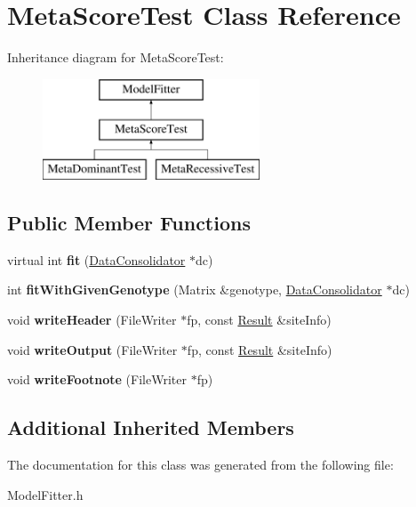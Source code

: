 \hypertarget{classMetaScoreTest}{\section{Meta\-Score\-Test Class Reference}
\label{classMetaScoreTest}
}
Inheritance diagram for Meta\-Score\-Test\-:\begin{figure}[H]
\begin{center}
\leavevmode
\includegraphics[height=3.000000cm]{classMetaScoreTest}
\end{center}
\end{figure}
\subsection*{Public Member Functions}
\begin{DoxyCompactItemize}
\item 
\hypertarget{classMetaScoreTest_a3342caf82dc635e98b676e6e43254fee}{virtual int {\bfseries fit} (\hyperlink{classDataConsolidator}{Data\-Consolidator} $\ast$dc)}\label{classMetaScoreTest_a3342caf82dc635e98b676e6e43254fee}

\item 
\hypertarget{classMetaScoreTest_a48b8ec26ac543a624308211daf486d1a}{int {\bfseries fit\-With\-Given\-Genotype} (Matrix \&genotype, \hyperlink{classDataConsolidator}{Data\-Consolidator} $\ast$dc)}\label{classMetaScoreTest_a48b8ec26ac543a624308211daf486d1a}

\item 
\hypertarget{classMetaScoreTest_ab6611f67774d393a0f8dc1af3c9ea702}{void {\bfseries write\-Header} (File\-Writer $\ast$fp, const \hyperlink{classResult}{Result} \&site\-Info)}\label{classMetaScoreTest_ab6611f67774d393a0f8dc1af3c9ea702}

\item 
\hypertarget{classMetaScoreTest_a31b12746201ee0ab0934e378a5e9abc9}{void {\bfseries write\-Output} (File\-Writer $\ast$fp, const \hyperlink{classResult}{Result} \&site\-Info)}\label{classMetaScoreTest_a31b12746201ee0ab0934e378a5e9abc9}

\item 
\hypertarget{classMetaScoreTest_ad69f7aba1bdb77dec7148c8568477131}{void {\bfseries write\-Footnote} (File\-Writer $\ast$fp)}\label{classMetaScoreTest_ad69f7aba1bdb77dec7148c8568477131}

\end{DoxyCompactItemize}
\subsection*{Additional Inherited Members}


The documentation for this class was generated from the following file\-:\begin{DoxyCompactItemize}
\item 
Model\-Fitter.\-h\end{DoxyCompactItemize}
